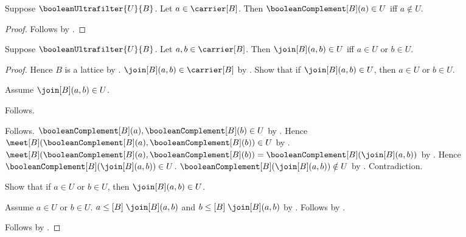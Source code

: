 \begin{proposition}\label{boolean_ultrafilter_complement_in_iff}
    Suppose $\booleanUltrafilter{U}{B}$.
    Let $a\in\carrier[B]$.
    Then $\booleanComplement[B](a)\in U$ iff $a\notin U$.
\end{proposition}
\begin{proof}
    Follows by
        .
\end{proof}

\begin{proposition}\label{boolean_ultrafilter_join_in_iff}
    Suppose $\booleanUltrafilter{U}{B}$.
    Let $a,b\in\carrier[B]$.
    Then $\join[B](a,b)\in U$ iff $a\in U$ or $b\in U$.
\end{proposition}
\begin{proof}
    Hence $B$ is a lattice by .
    $\join[B](a,b)\in\carrier[B]$ by .
    Show that if $\join[B](a,b)\in U$, then $a\in U$ or $b\in U$.
    \begin{subproof}
        Assume $\join[B](a,b)\in U$.
        \begin{byCase}
            Follows.
            \begin{byCase}
                Follows.
                $\booleanComplement[B](a),
                    \booleanComplement[B](b)\in U$ by
                    .
                Hence $\meet[B](\booleanComplement[B](a),
                    \booleanComplement[B](b))\in U$ by
                    .
                $\meet[B](\booleanComplement[B](a),
                    \booleanComplement[B](b))
                    =\booleanComplement[B](\join[B](a,b))$ by
                    .
                Hence $\booleanComplement[B](\join[B](a,b))\in U$.
                $\booleanComplement[B](\join[B](a,b))\notin U$ by
                    .
                Contradiction.
            \end{byCase}
        \end{byCase}
    \end{subproof}
    Show that if $a\in U$ or $b\in U$, then $\join[B](a,b)\in U$.
    \begin{subproof}
        Assume $a\in U$ or $b\in U$.
        $a\mathrel{\leq[B]}\join[B](a,b)$ and
            $b\mathrel{\leq[B]}\join[B](a,b)$ by .
        Follows by .
    \end{subproof}
    Follows by \auto.
\end{proof}

